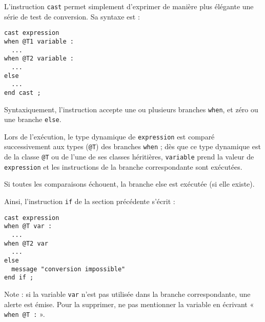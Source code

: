 L'instruction \texttt{cast} permet simplement d'exprimer de manière plus élégante une série de test de conversion. Sa syntaxe est :

\begin{lstlisting}[language=galgas]
cast expression
when @T1 variable :
  ...
when @T2 variable :
  ...
else
  ...
end cast ;
\end{lstlisting}

Syntaxiquement, l'instruction accepte une ou plusieurs branches \lstinline[language=galgas]{when}, et zéro ou une branche \lstinline[language=galgas]{else}.

Lors de l'exécution, le type dynamique de \lstinline[language=galgas]{expression} est comparé successivement aux types (\lstinline[language=galgas]{@T}) des branches \lstinline[language=galgas]{when} ; dès que ce type dynamique est de la classe \lstinline[language=galgas]{@T} ou de l'une de ses classes héritières, \lstinline[language=galgas]{variable} prend la valeur de \lstinline[language=galgas]{expression} et les instructions de la branche correspondante sont exécutées.

Si toutes les comparaisons échouent, la branche {else} est exécutée (si elle existe).


Ainsi, l'instruction \lstinline[language=galgas]{if} de la section précédente s'écrit :


\begin{lstlisting}[language=galgas]
cast expression
when @T var :
  ...
when @T2 var
  ...
else
  message "conversion impossible"
end if ;
\end{lstlisting}

Note : si la variable \lstinline[language=galgas]{var} n'est pas utilisée dans la branche correspondante, une alerte est émise. Pour la supprimer, ne pas mentionner la variable en écrivant « \lstinline[language=galgas]{when @T :} ».


